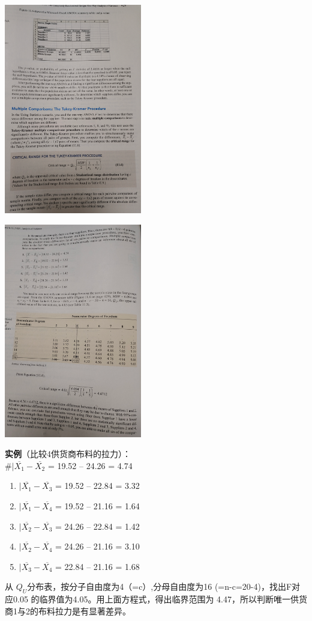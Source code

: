 \includegraphics[width=6cm]{微信截图_20221109095118.png}


\includegraphics[width=6cm]{微信截图_20221109095038.png}

\textbf{实例}（比较4供货商布料的拉力）：\\
\#\(|\overline{X_1} - \overline{X_2}\) = \textbar{}19.52 --
24.26\textbar{} = 4.74

\begin{enumerate}
\tightlist
\item
  \(|\overline{X_1} - \overline{X_3}\) = \textbar{}19.52 --
  22.84\textbar{} = 3.32
\item
  \(|\overline{X_1} - \overline{X_4}\) = \textbar{}19.52 --
  21.16\textbar{} = 1.64
\item
  \(|\overline{X_2} - \overline{X_3}\) = \textbar{}24.26 --
  22.84\textbar{} = 1.42
\item
  \(|\overline{X_2} - \overline{X_4}\) = \textbar{}24.26 --
  21.16\textbar{} = 3.10
\item
  \(|\overline{X_3} - \overline{X_4}\) = \textbar{}22.84 --
  21.16\textbar{} = 1.68
\end{enumerate}

从 \(Q_U\)分布表，按分子自由度为4（=c）,分母自由度为16
(=n-c=20-4)，找出F对应0.05 的临界值为4.05。用上面方程式，得出临界范围为
4.47，所以判断唯一供货商1与2的布料拉力是有显著差异。
